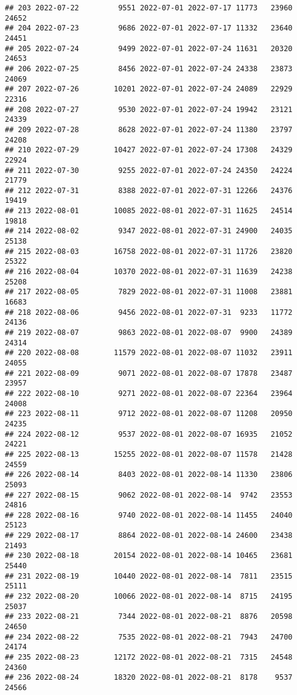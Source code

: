 \documentclass[
]{article}
\begin{document}
\begin{verbatim}
## 203 2022-07-22         9551 2022-07-01 2022-07-17 11773   23960      24652
## 204 2022-07-23         9686 2022-07-01 2022-07-17 11332   23640      24451
## 205 2022-07-24         9499 2022-07-01 2022-07-24 11631   20320      24653
## 206 2022-07-25         8456 2022-07-01 2022-07-24 24338   23873      24069
## 207 2022-07-26        10201 2022-07-01 2022-07-24 24089   22929      22316
## 208 2022-07-27         9530 2022-07-01 2022-07-24 19942   23121      24339
## 209 2022-07-28         8628 2022-07-01 2022-07-24 11380   23797      24208
## 210 2022-07-29        10427 2022-07-01 2022-07-24 17308   24329      22924
## 211 2022-07-30         9255 2022-07-01 2022-07-24 24350   24224      21779
## 212 2022-07-31         8388 2022-07-01 2022-07-31 12266   24376      19419
## 213 2022-08-01        10085 2022-08-01 2022-07-31 11625   24514      19818
## 214 2022-08-02         9347 2022-08-01 2022-07-31 24900   24035      25138
## 215 2022-08-03        16758 2022-08-01 2022-07-31 11726   23820      25322
## 216 2022-08-04        10370 2022-08-01 2022-07-31 11639   24238      25208
## 217 2022-08-05         7829 2022-08-01 2022-07-31 11008   23881      16683
## 218 2022-08-06         9456 2022-08-01 2022-07-31  9233   11772      24136
## 219 2022-08-07         9863 2022-08-01 2022-08-07  9900   24389      24314
## 220 2022-08-08        11579 2022-08-01 2022-08-07 11032   23911      24055
## 221 2022-08-09         9071 2022-08-01 2022-08-07 17878   23487      23957
## 222 2022-08-10         9271 2022-08-01 2022-08-07 22364   23964      24008
## 223 2022-08-11         9712 2022-08-01 2022-08-07 11208   20950      24235
## 224 2022-08-12         9537 2022-08-01 2022-08-07 16935   21052      24221
## 225 2022-08-13        15255 2022-08-01 2022-08-07 11578   21428      24559
## 226 2022-08-14         8403 2022-08-01 2022-08-14 11330   23806      25093
## 227 2022-08-15         9062 2022-08-01 2022-08-14  9742   23553      24816
## 228 2022-08-16         9740 2022-08-01 2022-08-14 11455   24040      25123
## 229 2022-08-17         8864 2022-08-01 2022-08-14 24600   23438      21493
## 230 2022-08-18        20154 2022-08-01 2022-08-14 10465   23681      25440
## 231 2022-08-19        10440 2022-08-01 2022-08-14  7811   23515      25111
## 232 2022-08-20        10066 2022-08-01 2022-08-14  8715   24195      25037
## 233 2022-08-21         7344 2022-08-01 2022-08-21  8876   20598      24650
## 234 2022-08-22         7535 2022-08-01 2022-08-21  7943   24700      24174
## 235 2022-08-23        12172 2022-08-01 2022-08-21  7315   24548      24360
## 236 2022-08-24        18320 2022-08-01 2022-08-21  8178    9537      24566

\end{verbatim}
\end{document}
